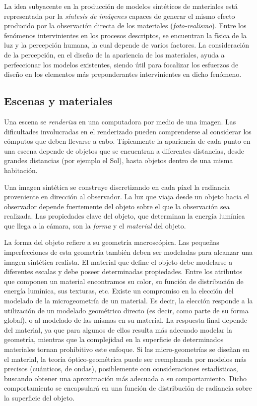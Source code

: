 La idea subyacente en la producción de modelos sintéticos de materiales está representada por la {\em síntesis de imágenes} capaces de generar el mismo efecto producido por la observación directa de los materiales ({\em foto-realismo}).
Entre los fenómenos intervinientes en los procesos descriptos, se encuentran la física de la luz y la percepción humana, la cual depende de varios factores.
La consideración de la percepción, en el diseño de la apariencia de los materiales, ayuda a perfeccionar los modelos existentes, siendo útil para focalizar los esfuerzos de diseño en los elementos más preponderantes intervinientes en dicho fenómeno.
 


\subsection{Escenas y materiales}
Una escena se {\em renderiza} en una computadora por medio de una imagen.
Las dificultades involucradas en el renderizado pueden comprenderse al considerar los cómputos que deben llevarse a cabo.
Típicamente la apariencia de cada punto en una escena depende de objetos que se encuentran a diferentes distancias, desde grandes distancias (por ejemplo el Sol), hasta objetos dentro de una misma habitación.

Una imagen sintética se construye discretizando en cada píxel la radiancia proveniente en dirección al observador.
La luz que viaja desde un objeto hacia el observador depende fuertemente del objeto sobre el que la observación sea realizada.
Las propiedades clave del objeto, que determinan la energía lumínica que llega a la cámara, son la {\em forma} y el {\em material} del objeto.

La forma del objeto refiere a su geometría macroscópica.
Las pequeñas imperfecciones de esta geometría también deben ser modeladas para alcanzar una imagen sintética realista.
El material que define el objeto debe modelarse a diferentes escalas y debe poseer determinadas propiedades.
Entre los atributos que componen un material encontramos su color, su función de distribución de energía lumínica, sus texturas, etc.
Existe un compromiso en la elección del modelado de la microgeometría de un material.
Es decir, la elección responde a la utilización de un modelado geométrico directo (es decir, como parte de su forma global), o al modelado de las mismas en su material.
La respuesta final depende del material, ya que para algunos de ellos resulta más adecuado modelar la geometría, mientras que la complejidad en la superficie de determinados materiales tornan prohibitivo este enfoque.
Si las micro-geometrías se diseñan en el material, la teoría óptico-geométrica puede ser reemplazada por modelos más precisos (cuánticos, de ondas), posiblemente con consideraciones estadísticas, buscando obtener una aproximación más adecuada a su comportamiento.
Dicho comportamiento se encapsulará en una función de distribución de radiancia sobre la superficie del objeto.



